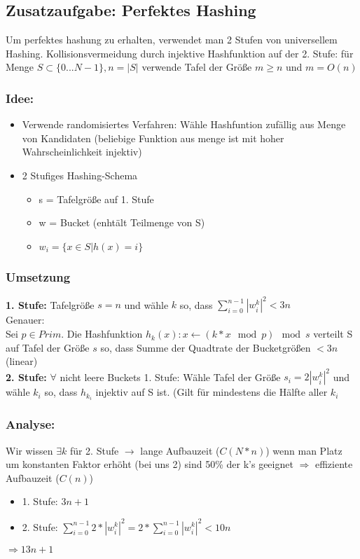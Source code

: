 \documentclass[10pt,a4paper]{article}
\begin{document}
\subsection*{Zusatzaufgabe: Perfektes Hashing}

Um perfektes hashung zu erhalten, verwendet man 2 Stufen von universellem Hashing. Kollisionsvermeidung durch injektive Hashfunktion auf der 2. Stufe: für Menge $S \subset \{0 ... N - 1\}, n = |S| $ verwende Tafel der Größe $m \geq n$ und $m = O(n)$

\subsubsection*{Idee:}
\begin{itemize}
    \item Verwende randomisiertes Verfahren: Wähle Hashfuntion zufällig aus Menge von Kandidaten (beliebige Funktion aus menge ist mit hoher Wahrscheinlichkeit injektiv)
    \item 2 Stufiges Hashing-Schema
    \begin{itemize}
        \item s = Tafelgröße auf 1. Stufe
        \item w = Bucket (enhtält Teilmenge von S)
        \item $w_i = \{x \in S | h(x) = i\}$
    \end{itemize}
\end{itemize}

\subsubsection*{Umsetzung}
\textbf{1. Stufe:} Tafelgröße $s=n$ und wähle $k$ so, dass $\sum \limits_{i=0}^{n-1} |w_i^k|^2 < 3n$\\
Genauer:\\
Sei $p \in Prim$. Die Hashfunktion $h_k(x): x \leftarrow (k*x \mod p) \mod s$ verteilt S auf Tafel der Größe $s$ so, dass Summe der Quadtrate der Bucketgrößen $< 3n$ (linear)\\
\textbf{2. Stufe:} $\forall$ nicht leere Buckets 1. Stufe: Wähle Tafel der Größe $s_i = 2|w_i^k|^2$ und wähle $k_i$ so, dass $h_{k_i}$ injektiv auf S ist. (Gilt für mindestens die Hälfte aller $k_i$

\subsubsection*{Analyse:}
Wir wissen $\exists k$ für 2. Stufe $\rightarrow$ lange Aufbauzeit ($C(N*n)$) wenn man Platz um konstanten Faktor erhöht (bei uns 2) sind 50\% der k's geeignet $\Rightarrow$ effiziente Aufbauzeit ($C(n)$) 
\begin{itemize}
    \item 1. Stufe: $3n+1$
    \item 2. Stufe: $\sum \limits_{i=0}^{n-1} 2*|w_i^k|^2 = 2* \sum \limits_{i=0}^{n-1} |w_i^k|^2 < 10n$
\end{itemize}
$\Rightarrow 13n+1$
\end{document}
